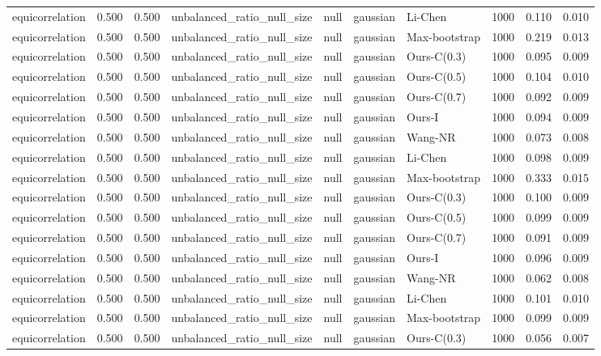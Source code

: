 \begin{tabular}{lrrllllrrr}
equicorrelation & 0.500 & 0.500 & unbalanced\_ratio\_null\_size & null & gaussian & Li-Chen & 1000 & 0.110 & 0.010 \\
equicorrelation & 0.500 & 0.500 & unbalanced\_ratio\_null\_size & null & gaussian & Max-bootstrap & 1000 & 0.219 & 0.013 \\
equicorrelation & 0.500 & 0.500 & unbalanced\_ratio\_null\_size & null & gaussian & Ours-C(0.3) & 1000 & 0.095 & 0.009 \\
equicorrelation & 0.500 & 0.500 & unbalanced\_ratio\_null\_size & null & gaussian & Ours-C(0.5) & 1000 & 0.104 & 0.010 \\
equicorrelation & 0.500 & 0.500 & unbalanced\_ratio\_null\_size & null & gaussian & Ours-C(0.7) & 1000 & 0.092 & 0.009 \\
equicorrelation & 0.500 & 0.500 & unbalanced\_ratio\_null\_size & null & gaussian & Ours-I & 1000 & 0.094 & 0.009 \\
equicorrelation & 0.500 & 0.500 & unbalanced\_ratio\_null\_size & null & gaussian & Wang-NR & 1000 & 0.073 & 0.008 \\
equicorrelation & 0.500 & 0.500 & unbalanced\_ratio\_null\_size & null & gaussian & Li-Chen & 1000 & 0.098 & 0.009 \\
equicorrelation & 0.500 & 0.500 & unbalanced\_ratio\_null\_size & null & gaussian & Max-bootstrap & 1000 & 0.333 & 0.015 \\
equicorrelation & 0.500 & 0.500 & unbalanced\_ratio\_null\_size & null & gaussian & Ours-C(0.3) & 1000 & 0.100 & 0.009 \\
equicorrelation & 0.500 & 0.500 & unbalanced\_ratio\_null\_size & null & gaussian & Ours-C(0.5) & 1000 & 0.099 & 0.009 \\
equicorrelation & 0.500 & 0.500 & unbalanced\_ratio\_null\_size & null & gaussian & Ours-C(0.7) & 1000 & 0.091 & 0.009 \\
equicorrelation & 0.500 & 0.500 & unbalanced\_ratio\_null\_size & null & gaussian & Ours-I & 1000 & 0.096 & 0.009 \\
equicorrelation & 0.500 & 0.500 & unbalanced\_ratio\_null\_size & null & gaussian & Wang-NR & 1000 & 0.062 & 0.008 \\
equicorrelation & 0.500 & 0.500 & unbalanced\_ratio\_null\_size & null & gaussian & Li-Chen & 1000 & 0.101 & 0.010 \\
equicorrelation & 0.500 & 0.500 & unbalanced\_ratio\_null\_size & null & gaussian & Max-bootstrap & 1000 & 0.099 & 0.009 \\
equicorrelation & 0.500 & 0.500 & unbalanced\_ratio\_null\_size & null & gaussian & Ours-C(0.3) & 1000 & 0.056 & 0.007 \\

\end{tabular}
